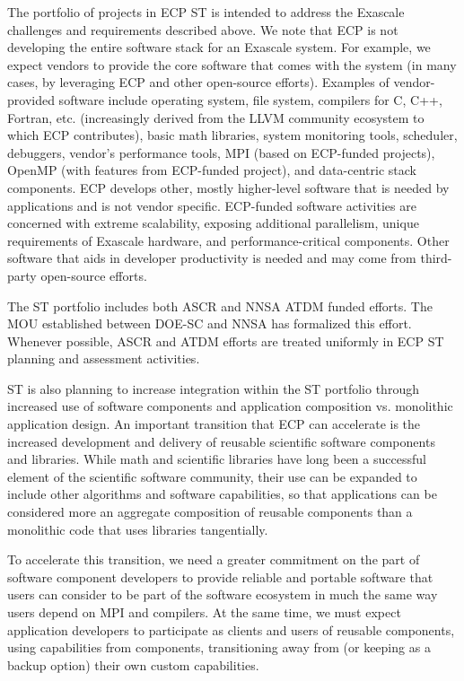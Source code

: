 The portfolio of projects in ECP ST is intended to address the Exascale challenges and requirements described above. We note that ECP is not developing the entire software stack for an Exascale system. For example, we expect vendors to provide the core software that comes with the system (in many cases, by leveraging ECP and other open-source efforts). Examples of vendor-provided software include operating system, file system, compilers for C, C++, Fortran, etc. (increasingly derived from the LLVM community ecosystem to which ECP contributes), basic math libraries, system monitoring tools, scheduler, debuggers, vendor’s performance tools, MPI (based on ECP-funded projects), OpenMP (with features from ECP-funded project), and data-centric stack components. ECP develops other, mostly higher-level software that is needed by applications and is not vendor specific. ECP-funded software activities are concerned with extreme scalability, exposing additional parallelism, unique requirements of Exascale hardware, and performance-critical components. Other software that aids in developer productivity is needed and may come from third-party open-source efforts.

The ST portfolio includes both ASCR and NNSA ATDM funded efforts. The MOU established between DOE-SC and NNSA has formalized this effort.  Whenever possible, ASCR and ATDM efforts are treated uniformly in ECP ST planning and assessment activities.

ST is also planning to increase integration within the ST portfolio through increased use of software components and application composition vs. monolithic application design. An important transition that ECP can accelerate is the increased development and delivery of reusable scientific software components and libraries. While math and scientific libraries have long been a successful element of the scientific software community, their use can be expanded to include other algorithms and software capabilities, so that applications can be considered more an aggregate composition of reusable components than a monolithic code that uses libraries tangentially.

To accelerate this transition, we need a greater commitment on the part of software component developers to provide reliable and portable software that users can consider to be part of the software ecosystem in much the same way users depend on MPI and compilers. At the same time, we must expect application developers to participate as clients and users of reusable components, using capabilities from components, transitioning away from (or keeping as a backup option) their own custom capabilities.

